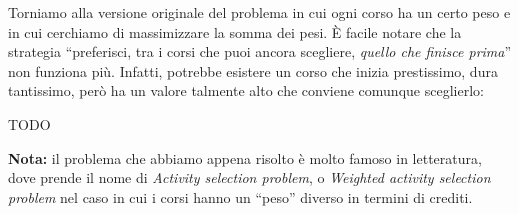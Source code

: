 \Quadratica
Torniamo alla versione originale del problema in cui ogni corso ha un certo peso e in cui cerchiamo di massimizzare la somma dei pesi. È facile notare che la strategia ``preferisci, tra i corsi che puoi ancora scegliere, \textit{quello che finisce prima}'' non funziona più. Infatti, potrebbe esistere un corso che inizia prestissimo, dura tantissimo, però ha un valore talmente alto che conviene comunque sceglierlo:

\begin{center}
\end{center}

TODO

\textbf{Nota:} il problema che abbiamo appena risolto è molto famoso in letteratura, dove prende il nome di \emph{Activity selection problem}, o \emph{Weighted activity selection problem} nel caso in cui i corsi hanno un ``peso'' diverso in termini di crediti.